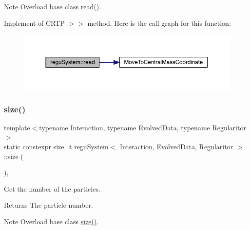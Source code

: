 \begin{DoxyNote}{Note}
Overload base class \mbox{\hyperlink{classregu_system_ae26daf3f6058c1be67fb00366706e2e4}{read()}}.
\end{DoxyNote}
Implement of C\+R\+TP \textquotesingle{}$>$$>$\textquotesingle{} method. Here is the call graph for this function\+:
\nopagebreak
\begin{figure}[H]
\begin{center}
\leavevmode
\includegraphics[width=350pt]{classregu_system_ae26daf3f6058c1be67fb00366706e2e4_cgraph}
\end{center}
\end{figure}
\mbox{\label{classregu_system_aceb0955bcd3e6ba7a6a1831953ac120b}} 
\subsubsection{\texorpdfstring{size()}{size()}}
{\footnotesize\ttfamily template$<$typename Interaction, typename Evolved\+Data, typename Regularitor$>$ \\
static constexpr size\+\_\+t \mbox{\hyperlink{classregu_system}{regu\+System}}$<$ Interaction, Evolved\+Data, Regularitor $>$\+::size (\begin{DoxyParamCaption}{ }\end{DoxyParamCaption})\hspace{0.3cm}{\ttfamily [inline]}, {\ttfamily [static]}}



Get the number of the particles. 

\begin{DoxyReturn}{Returns}
The particle number. 
\end{DoxyReturn}
\begin{DoxyNote}{Note}
Overload base class \mbox{\hyperlink{classregu_system_aceb0955bcd3e6ba7a6a1831953ac120b}{size()}}. 
\end{DoxyNote}
\mbox{\label{classregu_system_ad9aa4594055c550b56cda4242d498d45}} 
